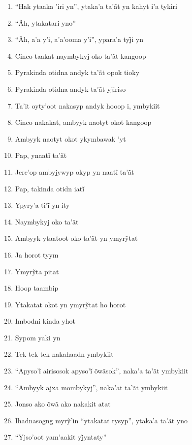 \begin{enumerate}
 \item ``Hak ytaaka 'iri yn'', ytaka'a ta'ãt yn kahyt i'a tykiri
 \item ``Ãh, ytakatari yno''
 \item ``Ãh, a’a y’i, a’a’ooma y’i'', ypara’a tyj̃i yn
 \begin{center}\end{center}
 \item Cinco taakat naymbykyj oko ta'ãt kangoop
 \item Pyrakinda otidna andyk ta'ãt opok tioky
 \item Pyrakinda otidna andyk ta'ãt yjiriso
 \item Ta'it oyty'oot nakasyp andyk hooop i, ymbykiit
 \item Cinco nakakat, ambyyk naotyt okot kangoop
 \item Ambyyk naotyt okot ykymbawak 'yt
 \begin{center}\end{center}
 \item Pap, ynaatĩ ta’ãt
 \item Jere’op ambyjywyp okyp yn naatĩ ta’ãt
 \item Pap, takinda otidn iatĩ
 \item Ypyry’a ti’ĩ yn ity
 \item Naymbykyj oko ta'ãt
 \item Ambyyk ytaatoot oko ta’ãt yn ymyrỹtat
 \item J̃a horot tyym
 \item Ymyrỹta pitat
 \item Hoop taambip
 \item Ytakatat okot yn ymyrỹtat ho horot
 \item Imbodni kinda yhot
 \item Sypom yaki yn
 \begin{center}\end{center}
 \item Tek tek tek nakahaadn ymbykiit
 \item ``Apyso’ĩ airisosok apyso’ĩ õwãsok'', naka’a ta’ãt ymbykiit
 \item ``Ambyyk ajxa mombykyj'', naka'at ta'ãt ymbykiit
 \item J̃onso ako õwã ako nakakit atat
 \item Ihadnasogng myrỹ’in ``ytakatat tysyp'', ytaka’a ta’ãt yno
 \item ``Yjso’oot yam’aakit yj̃yntaty''
 \begin{center}\end{center}

\end{enumerate}
